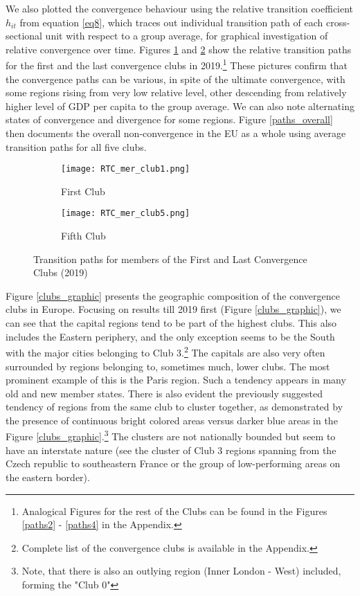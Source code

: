 \documentclass[11pt]{article}
\begin{document}
We also plotted the convergence behaviour using the relative transition coefficient $h_{it}$ from equation \ref{eq8}, which traces out individual transition path of each cross-sectional unit with respect to a group average, for graphical investigation of relative convergence over time. Figures \ref{paths1} and \ref{paths5} show the relative transition paths for the first and the last convergence clubs in 2019.\footnote{Analogical Figures for the rest of the Clubs can be found in the Figures \ref{paths2} - \ref{paths4} in the Appendix.} These pictures confirm that the convergence paths can be various, in spite of the ultimate convergence, with some regions rising from very low relative level, other descending from relatively higher level of GDP per capita to the group average. We can also note alternating states of convergence and divergence for some regions. Figure \ref{paths_overall} then documents the overall non-convergence in the EU as a whole using average transition paths for all five clubs.

\begin{figure}[!htbp]%
    \centering
\begin{subfigure}{0.45\textwidth}
    \centering
    \texttt{[image: RTC\_mer\_club1.png]}
    \caption{First Club}
    \label{paths1}   
\end{subfigure}\hfill
\begin{subfigure}{0.45\textwidth}
    \centering
    \texttt{[image: RTC\_mer\_club5.png]}
    \caption{Fifth Club}
    \label{paths5}
\end{subfigure}
\caption{Transition paths for members of the First and Last Convergence Clubs (2019)}
\label{convergence_paths}

\end{figure}


Figure \ref{clubs_graphic} presents the geographic composition of the convergence clubs in Europe. Focusing on results till 2019 first (Figure \ref{clubs_graphic}), we can see that the capital regions tend to be part of the highest clubs. This also includes the Eastern periphery, and the only exception seems to be the South with the major cities belonging to Club 3.\footnote{Complete list of the convergence clubs is available in the Appendix.} The capitals are also very often surrounded by regions belonging to, sometimes much, lower clubs. The most prominent example of this is the Paris region. Such a tendency appears in many old and new member states. There is also evident the previously suggested tendency of regions from the same club to cluster together, as demonstrated by the presence of continuous bright colored areas versus darker blue areas in the Figure \ref{clubs_graphic}.\footnote{Note, that there is also an outlying region (Inner London - West) included, forming the "Club 0"} The clusters are not nationally bounded but seem to have an interstate nature (see the cluster of Club 3 regions spanning from the Czech republic to southeastern France or the group of low-performing areas on the eastern border).
\end{document}
